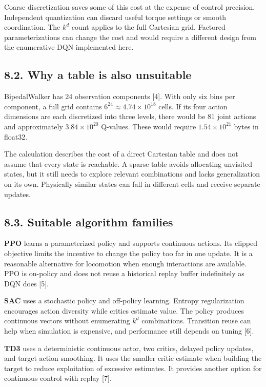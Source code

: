 \documentclass[10pt,a4paper,twocolumn]{extarticle}
\begin{document}
Coarse discretization saves some of this cost at the expense of control precision. Independent quantization can discard useful torque settings or smooth coordination. The $k^d$ count applies to the full Cartesian grid. Factored parameterizations can change the cost and would require a different design from the enumerative DQN implemented here.

\newpage
\subsection*{8.2. Why a table is also unsuitable}
BipedalWalker has 24 observation components [4]. With only six bins per component, a full grid contains $6^{24}\approx4.74\times10^{18}$ cells. If its four action dimensions are each discretized into three levels, there would be 81 joint actions and approximately $3.84\times10^{20}$ Q-values. These would require $1.54\times10^{21}$ bytes in float32.

The calculation describes the cost of a direct Cartesian table and does not assume that every state is reachable. A sparse table avoids allocating unvisited states, but it still needs to explore relevant combinations and lacks generalization on its own. Physically similar states can fall in different cells and receive separate updates.

\subsection*{8.3. Suitable algorithm families}
\textbf{PPO} learns a parameterized policy and supports continuous actions. Its clipped objective limits the incentive to change the policy too far in one update. It is a reasonable alternative for locomotion when enough interactions are available. PPO is on-policy and does not reuse a historical replay buffer indefinitely as DQN does [5].

\textbf{SAC} uses a stochastic policy and off-policy learning. Entropy regularization encourages action diversity while critics estimate value. The policy produces continuous vectors without enumerating $k^d$ combinations. Transition reuse can help when simulation is expensive, and performance still depends on tuning [6].

\textbf{TD3} uses a deterministic continuous actor, two critics, delayed policy updates, and target action smoothing. It uses the smaller critic estimate when building the target to reduce exploitation of excessive estimates. It provides another option for continuous control with replay [7].
\end{document}
